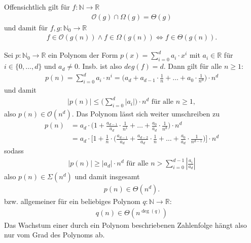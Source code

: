 \begin{anm}
	Offensichtlich gilt für $f : \mathbb{N} \rightarrow \mathbb{R}$
	\begin{gather*}
		\mathcal{O}(g) \cap \Omega(g) = \Theta(g)
	\end{gather*}
	und damit für $f,g : \mathbb{N}_0 \rightarrow \mathbb{R}$
	\begin{gather*}
		f \in \mathcal{O}(g(n)) \wedge f \in \Omega (g(n)) \Leftrightarrow f \in \Theta(g(n)).
	\end{gather*}
\end{anm}

\begin{bsp}
	Sei $p : \mathbb{N}_0 \rightarrow \mathbb{R}$ ein Polynom der Form $p(x) = \sum_{i=0}^d a_i \cdot x^i$ mit $a_i \in \mathbb{R}$ für $i \in \{0, \dots, d\}$ und $a_d \ne 0$. Insb. ist also $deg(f) = d$. Dann gilt für alle $n \ge 1$:
	\begin{gather*}
		p(n) = \sum\limits_{i=0}^d a_i \cdot n^i = \Big( a_d + a_{d-1} \cdot \frac{1}{n} + \dots + a_0 \cdot \frac{1}{n^d} \Big)\cdot n^d
	\end{gather*}
	und damit
	\begin{gather*}
		|p(n)| \le \Bigg( \sum\limits_{i=0}^d | a_i | \Bigg) \cdot n^d \text{ für alle } n \ge 1,
	\end{gather*}
	also $p(n) \in \mathcal{O}(n^d)$. Das Polynom lässt sich weiter umschreiben zu
	\begin{align*}
		p(n) & = a_d \cdot \Big( 1 + \frac{a_{d-1}}{a_d} \cdot \frac{1}{n^1} + \dots + \frac{a_0}{a_d} \cdot \frac{1}{n^d} \Big) \cdot n^d                                                         \\
		     & = a_d \cdot \Bigg[ 1 + \frac{1}{n} \cdot \Big( \frac{a_{d-1}}{a_d} + \frac{a_{d-2}}{a_d} \cdot \frac{1}{n} + \dots + \frac{a_0}{a_d} \cdot \frac{1}{n^{d-1}} \Big) \Bigg] \cdot n^d
	\end{align*}
	sodass
	\begin{gather*}
		| p(n) | \ge |a_d| \cdot n^d \text{ für alle } n > \sum\limits_{i=0}^{d-1} \left|\frac{a_i}{a_d}\right|
	\end{gather*}
	also $p(n) \in \Sigma(n^d)$ und damit insgesamt
	\begin{gather*}
		p(n) \in \Theta(n^d).
  \end{gather*}
  bzw. allgemeiner für ein beliebiges Polynom $q : \mathbb{N} \rightarrow \mathbb{R}$:
  \begin{gather*}
    q(n) \in \Theta(n^{\deg(q)})
  \end{gather*}
	Das Wachstum einer durch ein Polynom beschriebenen Zahlenfolge hängt also nur vom Grad des Polynoms ab.
\end{bsp}

